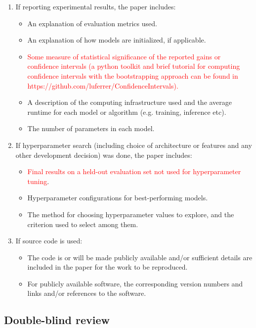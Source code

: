 \documentclass{Interspeech2024}
\newcommand{\red}[1]{\textcolor{red}{#1}}
\begin{document}
\begin{enumerate}
\item If reporting experimental results, the paper includes:
\begin{itemize}
\item An explanation of evaluation metrics used.
\item An explanation of how models are initialized, if applicable.
\item \red{Some measure of statistical significance of the reported gains or confidence intervals (a python toolkit and brief tutorial for computing confidence intervals with the bootstrapping approach can be found in https://github.com/luferrer/ConfidenceIntervals).}
\item A description of the computing infrastructure used and the average runtime for each model or algorithm (e.g. training, inference etc).
\item The number of parameters in each model.
\end{itemize}

\item If hyperparameter search (including choice of architecture or features and any other development decision) was done, the paper includes:
\begin{itemize}
\item \red{Final results on a held-out evaluation set not used for hyperparameter tuning}.
\item Hyperparameter configurations for best-performing models.
\item The method for choosing hyperparameter values to explore, and the criterion used to select among them.
\end{itemize}

\item If source code is used:
\begin{itemize}
\item The code is or will be made publicly available and/or sufficient details are included in the paper for the work to be reproduced.
\item For publicly available software, the corresponding version numbers and links and/or references to the software.
\end{itemize}


\end{enumerate}


\subsection{Double-blind review}
\label{section:doubleblind}
\end{document}
